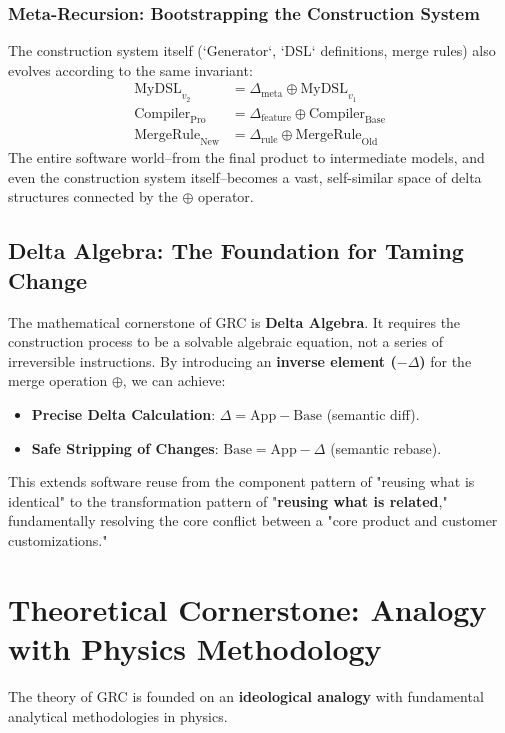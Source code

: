 \documentclass[11pt]{article}
\begin{document}
\subsubsection{Meta-Recursion: Bootstrapping the Construction System}
The construction system itself (`Generator`, `DSL` definitions, merge rules) also evolves according to the same invariant:
\begin{align*}
\text{MyDSL}_{v_2} &= \Delta_{\text{meta}} \oplus \text{MyDSL}_{v_1} \\
\text{Compiler}_{\text{Pro}} &= \Delta_{\text{feature}} \oplus \text{Compiler}_{\text{Base}} \\
\text{MergeRule}_{\text{New}} &= \Delta_{\text{rule}} \oplus \text{MergeRule}_{\text{Old}}
\end{align*}
The entire software world--from the final product to intermediate models, and even the construction system itself--becomes a vast, self-similar space of delta structures connected by the $\oplus$ operator.

\subsection{Delta Algebra: The Foundation for Taming Change}
The mathematical cornerstone of GRC is \textbf{Delta Algebra}. It requires the construction process to be a solvable algebraic equation, not a series of irreversible instructions. By introducing an \textbf{inverse element ($- \Delta$)} for the merge operation $\oplus$, we can achieve:
\begin{itemize}
    \item \textbf{Precise Delta Calculation}: $\Delta = \text{App} - \text{Base}$ (semantic diff).
    \item \textbf{Safe Stripping of Changes}: $\text{Base} = \text{App} - \Delta$ (semantic rebase).
\end{itemize}
This extends software reuse from the component pattern of "reusing what is identical" to the transformation pattern of "\textbf{reusing what is related}," fundamentally resolving the core conflict between a "core product and customer customizations."

\section{Theoretical Cornerstone: Analogy with Physics Methodology}

The theory of GRC is founded on an \textbf{ideological analogy} with fundamental analytical methodologies in physics.
\end{document}

